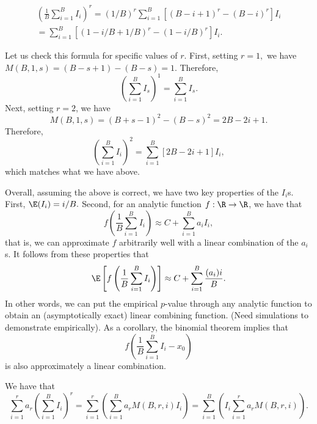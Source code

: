 \documentclass[12pt]{article}
\begin{document}
\begin{multline*}
\left(\frac{1}{B} \sum_{i=1}^B I_i\right)^r = (1/B)^r \sum_{i=1}^B \left[ (B-i+1)^r - (B-i)^r \right]I_i \\ = \sum_{i=1}^B \left[ (1 - i/B + 1/B)^r - (1 - i/B)^r \right] I_i.
\end{multline*}



Let us check this formula for specific values of $r$. First, setting $r = 1,$ we have $M(B,1,s) = (B - s + 1) - (B - s) = 1$. Therefore, $$\left(\sum_{i=1}^B I_s \right)^1 = \sum_{i=1}^B I_s.$$ Next, setting $r=2$, we have
$$M(B,1,s) = (B+s-1)^2 - (B-s)^2  = 2B - 2i + 1.$$ Therefore,
$$\left( \sum_{i=1}^B I_i \right)^2 = \sum_{i=1}^B [2B - 2i + 1]I_i,$$ which matches what we have above.

\clearpage
Overall, assuming the above is correct, we have two key properties of the $I_i$s. First, $\E(I_i) = i/B.$ Second, for an analytic function $f: \R \to \R$, we have that
$$f\left(\frac{1}{B} \sum_{i=1}^B I_i \right) \approx C + \sum_{i=1}^B a_i  I_i,$$
that is, we can approximate $f$ arbitrarily well with a linear combination of the $a_i$s. It follows from these properties that
$$ \E\left[ f\left( \frac{1}{B} \sum_{i=1}^B I_i \right) \right] \approx C + \sum_{i=1}^B \frac{(a_i)i}{B}.$$ In other words, we can put the empirical $p$-value through any analytic function to obtain an (asymptotically exact) linear combining function. (Need simulations to demonstrate empirically). As a corollary, the binomial theorem implies that
$$ f\left( \frac{1}{B} \sum_{i=1}^B I_i - x_0 \right)$$ is also approximately a linear combination.

We have that $$\sum_{i=1}^r a_r \left( \sum_{i=1}^B I_i \right)^r  = \sum_{i=1}^r \left( \sum_{i=1}^B a_r M(B,r,i) I_i \right) = \sum_{i=1}^B \left( I_i  \sum_{i=1}^r a_r M(B,r,i) \right).$$
\end{document}
